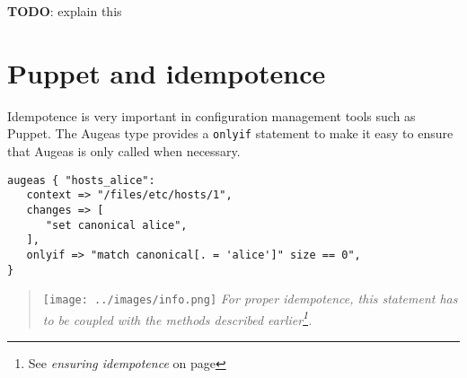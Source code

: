 \textbf{TODO}: explain this

\section{Puppet and idempotence}

Idempotence is very important in configuration management tools such as Puppet. The Augeas type provides a \verb!onlyif! statement to make it easy to ensure that Augeas is only called when necessary.

\begin{verbatim}
augeas { "hosts_alice":
   context => "/files/etc/hosts/1",
   changes => [
      "set canonical alice",
   ],
   onlyif => "match canonical[. = 'alice']" size == 0",
}
\end{verbatim}

\begin{quote}
\texttt{[image: ../images/info.png]} \emph{For proper idempotence, this statement has to be coupled with the methods described earlier\footnote{See \emph{ensuring idempotence} on page \pageref{sec:ensuring_idempotence}}.}
\end{quote}

